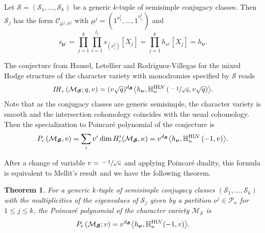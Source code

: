 \documentclass[JEP,XML,SOM,NoEqCountersInSection,Unicode,published]{cedram}
\newcommand{\rc}{\mathrm{c}}
\newcommand{\HLV}{\textup{HLV}}
\newcommand{\blangle}{\bigl\langle}
\newcommand{\brangle}{\bigr\rangle}
\theoremstyle{definition}
\theoremstyle{plain}
\newtheorem{theorem}[definition]{Theorem}
\newcommand{\IH}{\mathit{IH}}
\newcommand{\Part}{\mathcal{P}}
\begin{document}
Let $\boldsymbol{\mathcal{S}}=(\mathcal{S}_1,\dots,\mathcal{S}_k)$ be a generic $k$-tuple of semisimple conjugacy classes. Then $\mathcal{S}_j$ has the form $\mathcal{C}_{\underline{\mu}^j,\sigma^j}$ with
$\underline{\mu^j}=(1^{\nu^j_1},\dots,1^{\nu^j_{l_j}})$ and
\[
s_{\boldsymbol{\mu'}} = \prod_{j=1}^k\prod_{i=1}^{l_j} s_{(\nu^j_i)}[X_j] = \prod_{j=1}^k h_{\nu^j}[X_j] = h_{\boldsymbol{\nu}}.
\]

The conjecture from Hausel, Letellier and Rodriguez-Villegas \cite{Hausel_Letellier_Villegas} for the mixed Hodge structure of the character variety with monodromies specified by $\boldsymbol{\mathcal{S}}$ reads
\[
\IH_{\rc} \left(\mathcal{M}_{\boldsymbol{\mathcal{S}}};q,v\right) = (v \sqrt{q})^{d_{\boldsymbol{\mathcal{S}}}}\blangle h_{\boldsymbol{\nu}}, \mathbb{H}_n^{\HLV}\left(\sfrac{-1}{\sqrt{q}},v\sqrt{q}\right)\brangle.
\]
Note that as the conjugacy classes are generic semisimple, the character variety is smooth and the intersection cohomology coincides with the usual cohomology. Then the specialization to Poincaré polynomial of the conjecture is
\begin{equation}\label{eq_poincare_ss}
P_{\rc}\left(\mathcal{M}_{\boldsymbol{\mathcal{S}}}, v\right) = \sum_{i} v^i \dim H_\rc^i(\mathcal{M}_{\boldsymbol{\mathcal{S}}},\kappa) = v^{d_{\boldsymbol{\mathcal{S}}}}\blangle h_{\boldsymbol{\nu}}, \mathbb{H}^{\HLV}_n\left(-1,v\right)\brangle.
\end{equation}

After a change of variable $v=\sfrac{-1}{\sqrt{u}}$ and applying Poincaré duality, this formula is equivalent to Mellit's result \cite[Th.\,7.12]{Mellit2020} and we have the following theorem.
\begin{theorem}\label{th_mellit}
For a generic $k$-tuple of semisimple conjugacy classes $\left(\mathcal{S}_1,\dots,\mathcal{S}_k\right)$ with the multiplicities of the eigenvalues of $\mathcal{S}_j$ given by a partition $\nu^j\in \Part_n$ for $1\le j \le k$, the Poincaré polynomial of the character variety $\mathcal{M}_{\boldsymbol{\mathcal{S}}}$ is
\begin{equation}\label{eq_poincare_mellit}
P_{\rc} \left(\mathcal{M}_{\boldsymbol{\mathcal{S}}}; v\right) = v^{d_{\boldsymbol{\mathcal{S}}}}\blangle h_{\boldsymbol{\nu}}, \mathbb{H}_n^{\HLV}(-1,v)\brangle.
\end{equation}
\end{theorem}
\end{document}
